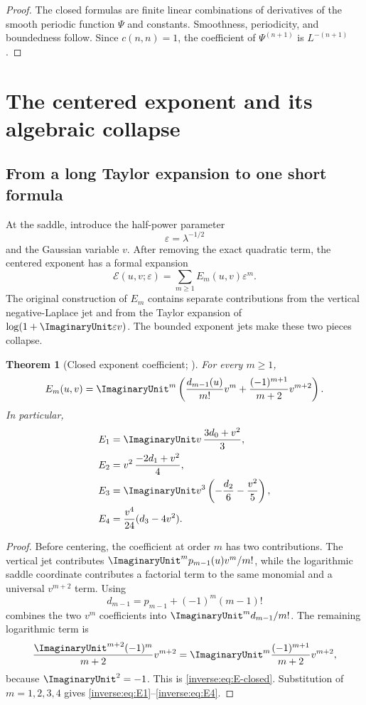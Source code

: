 \documentclass[11pt,oneside]{article}
\newtheorem{theorem}{Theorem}[section]
\theoremstyle{definition}
\theoremstyle{remark}
\begin{document}
\begin{proof}
The closed formulas are finite linear combinations of derivatives of the
smooth periodic function $\Psi$ and constants.  Smoothness, periodicity,
and boundedness follow.  Since $c(n,n)=1$, the coefficient of
$\Psi^{(n+1)}$ is $L^{-(n+1)}$.
\end{proof}


\section{The centered exponent and its algebraic collapse}
\label{inverse:sec:centered-exponent}

\subsection{From a long Taylor expansion to one short formula}

At the saddle, introduce the half-power parameter
\[
 \varepsilon=\lambda^{-1/2}
\]
and the Gaussian variable $v$.  After removing the exact quadratic term,
the centered exponent has a formal expansion
\[
 \mathcal E(u,v;\varepsilon)
 =\sum_{m\geq1}E_m(u,v)\varepsilon^m.
\]
The original construction of $E_m$ contains separate contributions from
the vertical negative-Laplace jet and from the Taylor expansion of
$\log(1+\ImaginaryUnit\varepsilon v)$.  The bounded exponent jets make these two
pieces collapse.

\begin{theorem}[Closed exponent coefficient; \Formalized]
\label{inverse:thm:closed-exponent}
For every $m\geq1$,
\begin{equation}
 E_m(u,v)=\ImaginaryUnit^m\left(
   \frac{d_{m-1}(u)}{m!}v^m
   +\frac{(-1)^{m+1}}{m+2}v^{m+2}
 \right). \label{inverse:eq:E-closed}
\end{equation}
In particular,
\begin{align}
 E_1&=\ImaginaryUnit v\,\frac{3d_0+v^2}{3}, \label{inverse:eq:E1}\\
 E_2&=v^2\,\frac{-2d_1+v^2}{4}, \label{inverse:eq:E2}\\
 E_3&=\ImaginaryUnit v^3\left(-\frac{d_2}{6}-\frac{v^2}{5}\right), \label{inverse:eq:E3}\\
 E_4&=\frac{v^4}{24}(d_3-4v^2). \label{inverse:eq:E4}
\end{align}
\end{theorem}

\begin{proof}
Before centering, the coefficient at order $m$ has two contributions.
The vertical jet contributes $\ImaginaryUnit^m p_{m-1}(u)v^m/m!$, while the
logarithmic saddle coordinate contributes a factorial term to the same
monomial and a universal $v^{m+2}$ term.  Using
\[
 d_{m-1}=p_{m-1}+(-1)^m(m-1)!
\]
combines the two $v^m$ coefficients into
$\ImaginaryUnit^m d_{m-1}/m!$.  The remaining logarithmic term is
\[
 \frac{\ImaginaryUnit^{m+2}(-1)^m}{m+2}v^{m+2}
 =\ImaginaryUnit^m\frac{(-1)^{m+1}}{m+2}v^{m+2},
\]
because $\ImaginaryUnit^2=-1$.  This is \eqref{inverse:eq:E-closed}.  Substitution of
$m=1,2,3,4$ gives \eqref{inverse:eq:E1}--\eqref{inverse:eq:E4}.
\end{proof}
\end{document}
